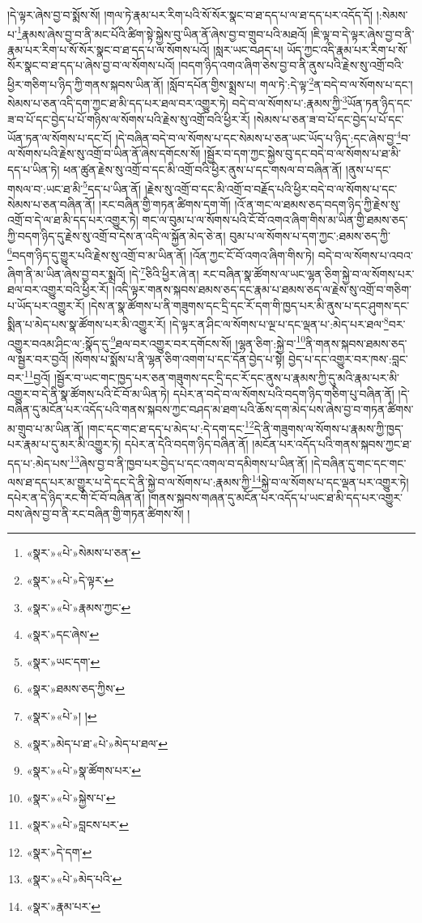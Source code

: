 །དེ་ལྟར་ཞེས་བྱ་བ་སྨོས་སོ། །གལ་ཏེ་རྣམ་པར་རིག་པའི་སོ་སོར་སྣང་བ་ཐ་དད་པ་ལ་ཐ་དད་པར་འདོད་དོ། །:སེམས་པ་\footnote{«སྣར་»«པེ་»སེམས་པ་ཅན་}རྣམས་ཞེས་བྱ་བ་ནི་མང་པོའི་ཚིག་སྟེ་སྐྱེས་བུ་ཡིན་ནོ་ཞེས་བྱ་བ་གྲུབ་པའི་མཐའོ། །ཇི་ལྟ་བ་དེ་ལྟར་ཞེས་བྱ་བ་ནི་རྣམ་པར་རིག་པ་སོ་སོར་སྣང་བ་ཐ་དད་པ་ལ་སོགས་པའོ། །སླར་ཡང་བཤད་པ། ཡོད་ཀྱང་འདི་རྣམ་པར་རིག་པ་སོ་སོར་སྣང་བ་ཐ་དད་པ་ཞེས་བྱ་བ་ལ་སོགས་པའོ། །བདག་ཉིད་འགའ་ཞིག་ཅེས་བྱ་བ་ནི་ནུས་པའི་རྗེས་སུ་འགྲོ་བའི་ཕྱིར་གཅིག་པ་ཉིད་ཀྱི་གནས་སྐབས་ཡིན་ནོ། །སློབ་དཔོན་གྱིས་སྨྲས་པ། གལ་ཏེ་:དེ་ལྟ་\footnote{«སྣར་»«པེ་»དེ་ལྟར་}ན་བདེ་བ་ལ་སོགས་པ་དང་། སེམས་པ་ཅན་འདི་དག་ཀྱང་ཐ་མི་དད་པར་ཐལ་བར་འགྱུར་ཏེ། བདེ་བ་ལ་སོགས་པ་:རྣམས་ཀྱི་\footnote{«སྣར་»«པེ་»རྣམས་ཀྱང་}ཡོན་ཏན་ཉིད་དང་ཟ་བ་པོ་དང་བྱེད་པ་པོ་གཉིས་ལ་སོགས་པའི་རྗེས་སུ་འགྲོ་བའི་ཕྱིར་རོ། །སེམས་པ་ཅན་ཟ་བ་པོ་དང་བྱེད་པ་པོ་དང་ཡོན་ཏན་ལ་སོགས་པ་དང་ངོ། །དེ་བཞིན་བདེ་བ་ལ་སོགས་པ་དང་སེམས་པ་ཅན་ཡང་ཡོད་པ་ཉིད་:དང་ཞེས་བྱ་\footnote{«སྣར་»དང་ཞེས་}བ་ལ་སོགས་པའི་རྗེས་སུ་འགྲོ་བ་ཡིན་ནོ་ཞེས་དགོངས་སོ། །སྦྱོར་བ་དག་ཀྱང་སྐྱེས་བུ་དང་བདེ་བ་ལ་སོགས་པ་ཐ་མི་དད་པ་ཡིན་ཏེ། ཕན་ཚུན་རྗེས་སུ་འགྲོ་བ་དང་མི་འགྲོ་བའི་ཕྱིར་ནུས་པ་དང་གསལ་བ་བཞིན་ནོ། །ནུས་པ་དང་གསལ་བ་:ཡང་ཐ་མི་\footnote{«སྣར་»ཡང་དག་}དད་པ་ཡིན་ནོ། །རྗེས་སུ་འགྲོ་བ་དང་མི་འགྲོ་བ་བརྗོད་པའི་ཕྱིར་བདེ་བ་ལ་སོགས་པ་དང་སེམས་པ་ཅན་བཞིན་ནོ། །རང་བཞིན་གྱི་གཏན་ཚིགས་དག་གོ། །འོ་ན་གང་ལ་ཐམས་ཅད་བདག་ཉིད་ཀྱི་རྗེས་སུ་འགྲོ་བ་དེ་ལ་ཐ་མི་དད་པར་འགྱུར་ཏེ། གང་ལ་བུམ་པ་ལ་སོགས་པའི་ངོ་བོ་འགའ་ཞིག་གིས་མ་ཡིན་གྱི་ཐམས་ཅད་ཀྱི་བདག་ཉིད་དུ་རྗེས་སུ་འགྲོ་བ་དེས་ན་འདི་ལ་སྐྱོན་མེད་ཅེ་ན། བུམ་པ་ལ་སོགས་པ་དག་ཀྱང་:ཐམས་ཅད་ཀྱི་\footnote{«སྣར་»ཐམས་ཅད་ཀྱིས་}བདག་ཉིད་དུ་གྱུར་པའི་རྗེས་སུ་འགྲོ་བ་མ་ཡིན་ནོ། །འོན་ཀྱང་ངོ་བོ་འགའ་ཞིག་གིས་ཏེ། བདེ་བ་ལ་སོགས་པ་འབའ་ཞིག་ནི་མ་ཡིན་ཞེས་བྱ་བར་སྨྲའོ། །དེ་\footnote{«སྣར་»«པེ་»། །}ཅིའི་ཕྱིར་ཞེ་ན། རང་བཞིན་སྣ་ཚོགས་ལ་ཡང་ལྷན་ཅིག་སྐྱེ་བ་ལ་སོགས་པར་ཐལ་བར་འགྱུར་བའི་ཕྱིར་རོ། །འདི་ལྟར་གནས་སྐབས་ཐམས་ཅད་དང་རྣམ་པ་ཐམས་ཅད་ལ་རྗེས་སུ་འགྲོ་བ་གཅིག་པ་ཡོད་པར་འགྱུར་རོ། །དེས་ན་སྣ་ཚོགས་པ་ནི་གཟུགས་དང་དྲི་དང་རོ་དག་གི་ཁྱད་པར་མི་ནུས་པ་དང་ཤུགས་དང་སྨིན་པ་མེད་པས་སྣ་ཚོགས་པར་མི་འགྱུར་རོ། །དེ་ལྟར་ན་ཤིང་ལ་སོགས་པ་ལྔ་པ་དང་ལྡན་པ་:མེད་པར་ཐལ་\footnote{«སྣར་»མེད་པ་ཐ་«པེ་»མེད་པ་ཐལ་}བར་འགྱུར་བའམ་ཤིང་ལ་:སྣོད་དུ་\footnote{«སྣར་»«པེ་»སྣ་ཚོགས་པར་}ཐལ་བར་འགྱུར་བར་དགོངས་སོ། །ལྷན་ཅིག་:སྐྱེ་བ་\footnote{«སྣར་»«པེ་»སྐྱེས་པ་}ནི་གནས་སྐབས་ཐམས་ཅད་ལ་སྦྱར་བར་བྱའོ། །སོགས་པ་སྨོས་པ་ནི་ལྷན་ཅིག་འགག་པ་དང་དོན་བྱེད་པ་སྟེ། བྱེད་པ་དང་འགྱུར་བར་ཁས་:བླང་བར་\footnote{«སྣར་»«པེ་»བླངས་པར་}བྱའོ། །སྦྱོར་བ་ཡང་གང་ཁྱད་པར་ཅན་གཟུགས་དང་དྲི་དང་རོ་དང་ནུས་པ་རྣམས་ཀྱི་དུ་མའི་རྣམ་པར་མི་འགྱུར་བ་དེ་ནི་སྣ་ཚོགས་པའི་ངོ་བོ་མ་ཡིན་ཏེ། དཔེར་ན་བདེ་བ་ལ་སོགས་པའི་བདག་ཉིད་གཅིག་པུ་བཞིན་ནོ། །དེ་བཞིན་དུ་མངོན་པར་འདོད་པའི་གནས་སྐབས་ཀྱང་བཤད་མ་ཐག་པའི་ཆོས་དག་མེད་པས་ཞེས་བྱ་བ་གཏན་ཚིགས་མ་གྲུབ་པ་མ་ཡིན་ནོ། །གང་དང་གང་ཐ་དད་པ་མེད་པ་:དེ་དག་དང་\footnote{«སྣར་»དེ་དག་}དེ་ནི་གཟུགས་ལ་སོགས་པ་རྣམས་ཀྱི་ཁྱད་པར་རྣམ་པ་དུ་མར་མི་འགྱུར་ཏེ། དཔེར་ན་དེའི་བདག་ཉིད་བཞིན་ནོ། །མངོན་པར་འདོད་པའི་གནས་སྐབས་ཀྱང་ཐ་དད་པ་:མེད་པས་\footnote{«སྣར་»«པེ་»མེད་པའི་}ཞེས་བྱ་བ་ནི་ཁྱབ་པར་བྱེད་པ་དང་འགལ་བ་དམིགས་པ་ཡིན་ནོ། །དེ་བཞིན་དུ་གང་དང་གང་ལས་ཐ་དད་པར་མ་གྱུར་པ་དེ་དང་དེ་ནི་སྐྱེ་བ་ལ་སོགས་པ་:རྣམས་ཀྱི་\footnote{«སྣར་»རྣམ་པར་}སྐྱེ་བ་ལ་སོགས་པ་དང་ལྡན་པར་འགྱུར་ཏེ། དཔེར་ན་དེ་ཉིད་རང་གི་ངོ་བོ་བཞིན་ནོ། །གནས་སྐབས་གཞན་དུ་མངོན་པར་འདོད་པ་ཡང་ཐ་མི་དད་པར་འགྱུར་བས་ཞེས་བྱ་བ་ནི་རང་བཞིན་གྱི་གཏན་ཚིགས་སོ། །
